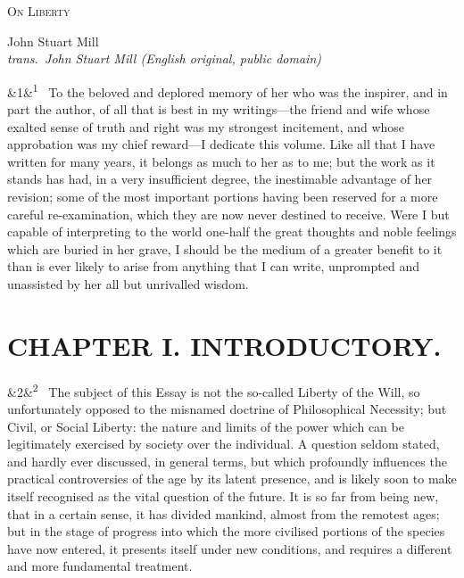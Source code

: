 \documentclass[12pt]{article}
\newcommand{\work}[1]{\begin{center}\LARGE\scshape #1\end{center}}
\newcommand{\attrib}[2]{\begin{center}\large #1\\[2pt]\small\itshape trans.\ #2\end{center}\vspace{1em}}
\newcommand{\para}[1][]{\par\noindent\ifx&#1&\else\textsuperscript{\footnotesize #1}~\fi}
\begin{document}
\work{On Liberty}
\attrib{John Stuart Mill}{John Stuart Mill (English original, public domain)}

\para[1] To the beloved and deplored memory of her who was the inspirer, and in part the author, of all that is best in my writings---the friend and wife whose exalted sense of truth and right was my strongest incitement, and whose approbation was my chief reward---I dedicate this volume. Like all that I have written for many years, it belongs as much to her as to me; but the work as it stands has had, in a very insufficient degree, the inestimable advantage of her revision; some of the most important portions having been reserved for a more careful re-examination, which they are now never destined to receive. Were I but capable of interpreting to the world one-half the great thoughts and noble feelings which are buried in her grave, I should be the medium of a greater benefit to it than is ever likely to arise from anything that I can write, unprompted and unassisted by her all but unrivalled wisdom.

\section*{CHAPTER I. INTRODUCTORY.}

\para[2] The subject of this Essay is not the so-called Liberty of the Will, so unfortunately opposed to the misnamed doctrine of Philosophical Necessity; but Civil, or Social Liberty: the nature and limits of the power which can be legitimately exercised by society over the individual. A question seldom stated, and hardly ever discussed, in general terms, but which profoundly influences the practical controversies of the age by its latent presence, and is likely soon to make itself recognised as the vital question of the future. It is so far from being new, that in a certain sense, it has divided mankind, almost from the remotest ages; but in the stage of progress into which the more civilised portions of the species have now entered, it presents itself under new conditions, and requires a different and more fundamental treatment.
\end{document}
